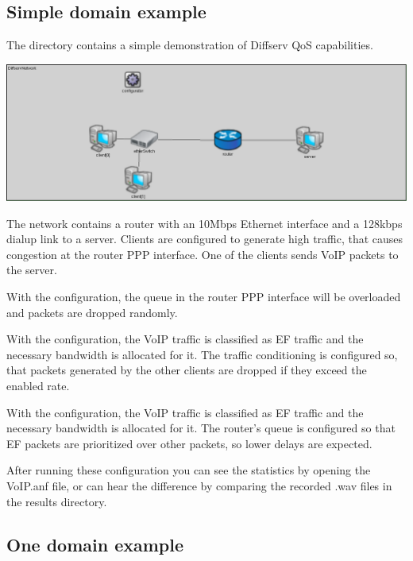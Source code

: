 
\subsection{Simple domain example}

The  directory contains a
simple demonstration of Diffserv QoS capabilities.

\begin{center}
\includegraphics[scale=0.3]{figures/SimpleDiffservNetwork.png}
\end{center}

The network contains a router with an 10Mbps Ethernet interface and a
128kbps dialup link to a server. Clients are configured to generate
high traffic, that causes congestion at the router PPP interface.
One of the clients sends VoIP packets to the server.

With the  configuration, the queue in the router PPP interface
will be overloaded and packets are dropped randomly.

With the  configuration, the VoIP traffic is classified as EF
traffic and the necessary bandwidth is allocated for it. The traffic conditioning
is configured so, that packets generated by the other clients are dropped if they
exceed the enabled rate.

With the  configuration, the VoIP traffic is classified as EF
traffic and the necessary bandwidth is allocated for it. The router's queue is configured
so that EF packets are prioritized over other packets, so lower delays are expected.

After running these configuration you can see the statistics by opening the
VoIP.anf file, or can hear the difference by comparing the recorded .wav files
in the results directory.

\subsection{One domain example}

